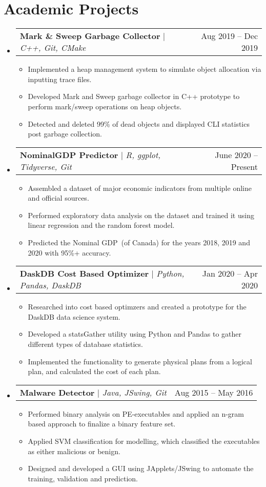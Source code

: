 \documentclass[letterpaper,10pt]{article}
\makeatletter
\newcommand{\resumeItem}[1]{
  \item\small{
    {#1 \vspace{-2pt}}
  }
}
\newcommand{\resumeProjectHeading}[2]{
    \item
    \begin{tabular*}{0.97\textwidth}{l@{\extracolsep{\fill}}r}
      \small#1 & #2 \\
    \end{tabular*}\vspace{-7pt}
}
\newcommand{\resumeSubHeadingListStart}{\begin{itemize}[leftmargin=0.15in, label={}]}
\newcommand{\resumeSubHeadingListEnd}{\end{itemize}}
\newcommand{\resumeItemListStart}{\begin{itemize}}
\newcommand{\resumeItemListEnd}{\end{itemize}\vspace{-5pt}}
\makeatother
\begin{document}
\section{Academic Projects}
    \resumeSubHeadingListStart
    \resumeProjectHeading
          {\textbf{Mark \& Sweep Garbage Collector} $|$ \emph{C++, Git, CMake}}{Aug 2019 -- Dec 2019}
          \resumeItemListStart
            \resumeItem{Implemented a heap management system to simulate object allocation via inputting trace files.}
            \resumeItem{Developed Mark and Sweep garbage collector in C++ prototype to perform mark/sweep operations on heap objects.}
            \resumeItem{Detected and deleted 99\% of dead objects and displayed CLI statistics post garbage collection.}
          \resumeItemListEnd  
      \resumeProjectHeading
          {\textbf{NominalGDP Predictor} $|$ \emph{R, ggplot, Tidyverse, Git}}{June 2020 -- Present}
          \resumeItemListStart
            \resumeItem{Assembled a dataset of major economic indicators from multiple online and official sources.}
            \resumeItem{Performed exploratory data analysis on the dataset and trained it using linear regression and the random forest model.}
            \resumeItem{Predicted the Nominal GDP~(of Canada) for the years 2018, 2019 and 2020 with 95\%+ accuracy.}
          \resumeItemListEnd
         \resumeProjectHeading
          {\textbf{DaskDB Cost Based Optimizer} $|$ \emph{Python, Pandas, DaskDB}}{Jan 2020 -- Apr 2020}
          \resumeItemListStart
            \resumeItem{Researched into cost based optimzers and created a prototype for the DaskDB data science system.}
            \resumeItem{Developed a statsGather utility using Python and Pandas to gather different types of database statistics.}
            \resumeItem{Implemented the functionality to generate physical plans from a logical plan, and calculated the cost of each plan.}
          \resumeItemListEnd
      \resumeProjectHeading
          {\textbf{Malware Detector} $|$ \emph{Java, JSwing, Git}}{Aug 2015 -- May 2016}
          \resumeItemListStart
            \resumeItem{Performed binary analysis on PE-executables and applied an n-gram based approach to finalize a binary feature set.}
            \resumeItem{Applied SVM classification for modelling, which classified the executables as either malicious or benign.}
            \resumeItem{Designed and developed a GUI using JApplets/JSwing to automate the training, validation and prediction.}
          \resumeItemListEnd
    \resumeSubHeadingListEnd
\end{document}
